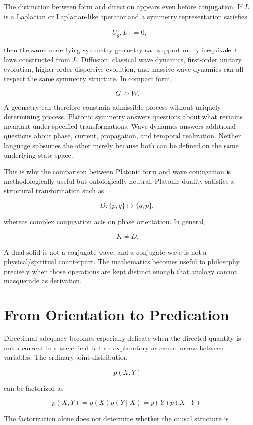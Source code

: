 The distinction between form and direction appears even before conjugation. If \(L\) is a Laplacian or Laplacian-like operator and a symmetry representation satisfies

\[
[U_g,L]=0,
\]

then the same underlying symmetry geometry can support many inequivalent laws constructed from \(L\). Diffusion, classical wave dynamics, first-order unitary evolution, higher-order dispersive evolution, and massive wave dynamics can all respect the same symmetry structure. In compact form,

\[
\boxed{G\nRightarrow W}.
\]

A geometry can therefore constrain admissible process without uniquely determining process. Platonic symmetry answers questions about what remains invariant under specified transformations. Wave dynamics answers additional questions about phase, current, propagation, and temporal realization. Neither language subsumes the other merely because both can be defined on the same underlying state space.

This is why the comparison between Platonic form and wave conjugation is methodologically useful but ontologically neutral. Platonic duality satisfies a structural transformation such as

\[
D:\{p,q\}\longmapsto\{q,p\},
\]

whereas complex conjugation acts on phase orientation. In general,

\[
\boxed{K\neq D}.
\]

A dual solid is not a conjugate wave, and a conjugate wave is not a physical/spiritual counterpart. The mathematics becomes useful to philosophy precisely when those operations are kept distinct enough that analogy cannot masquerade as derivation.

\section{From Orientation to Predication}

Directional adequacy becomes especially delicate when the directed quantity is not a current in a wave field but an explanatory or causal arrow between variables. The ordinary joint distribution

\[
p(X,Y)
\]

can be factorized as

\[
p(X,Y)=p(X)p(Y\mid X)=p(Y)p(X\mid Y).
\]

The factorization alone does not determine whether the causal structure is

